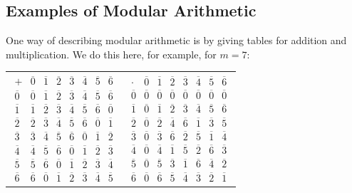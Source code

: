 \subsection{Examples of Modular Arithmetic}

One way of describing modular arithmetic is by giving tables for addition and
multiplication. We do this here, for example, for $m=7$:
\begin{center}
\begin{tabular}{cc}
$\begin{array}{c|ccccccc}
+&\overline{0}&\overline{1}&\overline{2}&\overline{3}&\overline{4}&\overline{5}&\overline{6}\\
\hline
\overline{0}&\overline{0}&\overline{1}&\overline{2}&\overline{3}&\overline{4}&\overline{5}&\overline{6}\\
\overline{1}&\overline{1}&\overline{2}&\overline{3}&\overline{4}&\overline{5}&\overline{6}&\overline{0}\\
\overline{2}&\overline{2}&\overline{3}&\overline{4}&\overline{5}&\overline{6}&\overline{0}&\overline{1}\\
\overline{3}&\overline{3}&\overline{4}&\overline{5}&\overline{6}&\overline{0}&\overline{1}&\overline{2}\\
\overline{4}&\overline{4}&\overline{5}&\overline{6}&\overline{0}&\overline{1}&\overline{2}&\overline{3}\\
\overline{5}&\overline{5}&\overline{6}&\overline{0}&\overline{1}&\overline{2}&\overline{3}&\overline{4}\\
\overline{6}&\overline{6}&\overline{0}&\overline{1}&\overline{2}&\overline{3}&\overline{4}&\overline{5}
\end{array}$
&
$\begin{array}{c|ccccccc}
\cdot&\overline{0}&\overline{1}&\overline{2}&\overline{3}&\overline{4}&\overline{5}&\overline{6}\\
\hline
\overline{0}&\overline{0}&\overline{0}&\overline{0}&\overline{0}&\overline{0}&\overline{0}&\overline{0}\\
\overline{1}&\overline{0}&\overline{1}&\overline{2}&\overline{3}&\overline{4}&\overline{5}&\overline{6}\\
\overline{2}&\overline{0}&\overline{2}&\overline{4}&\overline{6}&\overline{1}&\overline{3}&\overline{5}\\
\overline{3}&\overline{0}&\overline{3}&\overline{6}&\overline{2}&\overline{5}&\overline{1}&\overline{4}\\
\overline{4}&\overline{0}&\overline{4}&\overline{1}&\overline{5}&\overline{2}&\overline{6}&\overline{3}\\
\overline{5}&\overline{0}&\overline{5}&\overline{3}&\overline{1}&\overline{6}&\overline{4}&\overline{2}\\
\overline{6}&\overline{0}&\overline{6}&\overline{5}&\overline{4}&\overline{3}&\overline{2}&\overline{1}
\end{array}$
\end{tabular}
\end{center}

